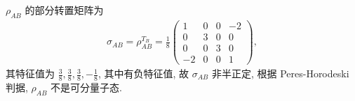 \documentclass{assignment}
\begin{document}
\begin{sol}
    $\rho_{AB}$ 的部分转置矩阵为
    \begin{align}
        \sigma_{AB}=\rho_{AB}^{T_B}=\frac{1}{8}\begin{pmatrix}
            1&0&0&-2\\
            0&3&0&0\\
            0&0&3&0\\
            -2&0&0&1
        \end{pmatrix},
    \end{align}
    其特征值为 $\frac{3}{8},\frac{3}{8},\frac{3}{8},-\frac{1}{8}$, 其中有负特征值, 故 $\sigma_{AB}$ 非半正定, 根据 Peres-Horodeski 判据, $\rho_{AB}$ 不是可分量子态.
\end{sol}
\end{document}
